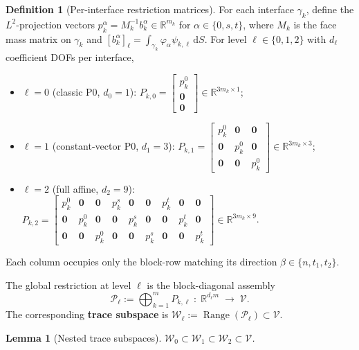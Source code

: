 \documentclass[11pt,a4paper]{article}
\newtheorem{lemma}[theorem]{Lemma}
\theoremstyle{definition}
\newtheorem{definition}[theorem]{Definition}
\newcommand{\R}{\mathbb{R}}
\newcommand{\iface}{\gamma}
\newcommand{\zero}{\bm{0}}
\newcommand{\Range}{\operatorname{Range}}
\newcommand{\Vspace}{\mathcal{V}}
\newcommand{\Wspace}{\mathcal{W}}
\newcommand{\Pcal}{\mathcal{P}}
\begin{document}
\begin{definition}[Per-interface restriction matrices]\label{def:Pkl}
  For each interface $\iface_k$, define the $L^2$-projection vectors
  $p_k^\alpha = M_k^{-1} b_k^\alpha \in \R^{m_k}$ for
  $\alpha\in\{0,s,t\}$, where
  $M_k$ is the face mass matrix on $\iface_k$ and
  $[b_k^\alpha]_\ell = \int_{\iface_k} \varphi_\alpha\psi_{k,\ell}\,\mathrm{d}S$.
  For level $\ell\in\{0,1,2\}$ with $d_\ell$ coefficient DOFs per interface,
  \begin{itemize}
    \item $\ell=0$ (classic P0, $d_0=1$):
      $P_{k,0} = \begin{bmatrix} p_k^0 \\ \zero \\ \zero \end{bmatrix}
       \in \R^{3m_k\times 1}$;
    \item $\ell=1$ (constant-vector P0, $d_1=3$):
      $P_{k,1} = \begin{bmatrix}
        p_k^0 & \zero   & \zero   \\
        \zero & p_k^0   & \zero   \\
        \zero & \zero   & p_k^0
      \end{bmatrix} \in \R^{3m_k\times 3}$;
    \item $\ell=2$ (full affine, $d_2=9$):
      $P_{k,2} = \begin{bmatrix}
        p_k^0 & \zero & \zero & p_k^s & \zero & \zero & p_k^t & \zero & \zero \\[2pt]
        \zero & p_k^0 & \zero & \zero & p_k^s & \zero & \zero & p_k^t & \zero \\[2pt]
        \zero & \zero & p_k^0 & \zero & \zero & p_k^s & \zero & \zero & p_k^t
      \end{bmatrix} \in \R^{3m_k\times 9}$.
  \end{itemize}
  Each column occupies only the block-row matching its direction
  $\beta\in\{n,t_1,t_2\}$.
\end{definition}

The global restriction at level $\ell$ is the block-diagonal assembly
\begin{equation}\label{eq:Pcal}
  \Pcal_\ell := \bigoplus_{k=1}^m P_{k,\ell}
  \;:\; \R^{d_\ell m} \;\longrightarrow\; \Vspace.
\end{equation}
The corresponding \textbf{trace subspace} is
$\Wspace_\ell := \Range(\Pcal_\ell) \subset \Vspace$.

\begin{lemma}[Nested trace subspaces]\label{lem:nested}
  $\Wspace_0 \subset \Wspace_1 \subset \Wspace_2 \subset \Vspace$.
\end{lemma}
\end{document}
